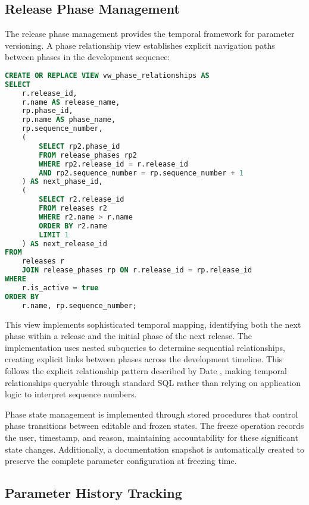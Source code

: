 \subsection{Release Phase Management}
\label{subsec:release-phase-management}

The release phase management provides the temporal framework for parameter versioning. A phase relationship view establishes explicit navigation paths between phases in the development sequence:

\begin{lstlisting}[language=SQL, caption={Phase Relationship View Implementation}, label={lst:phase-relationship-view}]
CREATE OR REPLACE VIEW vw_phase_relationships AS
SELECT 
    r.release_id,
    r.name AS release_name,
    rp.phase_id,
    rp.name AS phase_name,
    rp.sequence_number,
    (
        SELECT rp2.phase_id
        FROM release_phases rp2
        WHERE rp2.release_id = r.release_id
        AND rp2.sequence_number = rp.sequence_number + 1
    ) AS next_phase_id,
    (
        SELECT r2.release_id
        FROM releases r2
        WHERE r2.name > r.name
        ORDER BY r2.name
        LIMIT 1
    ) AS next_release_id
FROM 
    releases r
    JOIN release_phases rp ON r.release_id = rp.release_id
WHERE 
    r.is_active = true
ORDER BY 
    r.name, rp.sequence_number;
\end{lstlisting}

This view implements sophisticated temporal mapping, identifying both the next phase within a release and the initial phase of the next release. The implementation uses nested subqueries to determine sequential relationships, creating explicit links between phases across the development timeline. This follows the explicit relationship pattern described by Date \cite{date2011sql}, making temporal relationships queryable through standard SQL rather than relying on application logic to interpret sequence numbers.

Phase state management is implemented through stored procedures that control phase transitions between editable and frozen states. The freeze operation records the user, timestamp, and reason, maintaining accountability for these significant state changes. Additionally, a documentation snapshot is automatically created to preserve the complete parameter configuration at freezing time.

\subsection{Parameter History Tracking}
\label{subsec:parameter-history-tracking}

